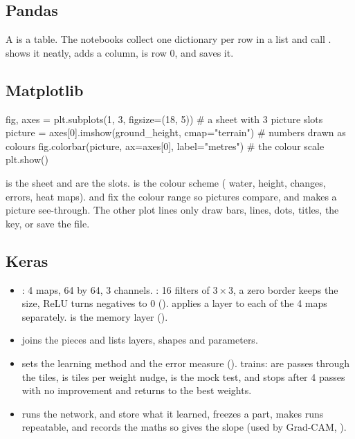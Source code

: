 \subsection{Pandas}\label{py:pandas}
A  is a table. The notebooks collect one dictionary per row in a list and call .  shows it neatly,  adds a column,  is row 0, and  saves it.

\subsection{Matplotlib}\label{py:plots}
\begin{pycode}
fig, axes = plt.subplots(1, 3, figsize=(18, 5))      # a sheet with 3 picture slots
picture = axes[0].imshow(ground_height, cmap="terrain")  # numbers drawn as colours
fig.colorbar(picture, ax=axes[0], label="metres")    # the colour scale
plt.show()
\end{pycode}
 is the sheet and  are the slots.  is the colour scheme ( water,  height,  changes,  errors,  heat maps).  and  fix the colour range so pictures compare, and  makes a picture see-through. The other plot lines only draw bars, lines, dots, titles, the key, or save the file.

\subsection{Keras}\label{py:keras}
\begin{itemize}
\item {}: 4 maps, 64 by 64, 3 channels. : 16 filters of $3\times3$, a zero border keeps the size, ReLU turns negatives to 0 ().  applies a layer to each of the 4 maps separately.  is the memory layer ().\item {} joins the pieces and  lists layers, shapes and parameters.
\item {} sets the learning method and the error measure ().  trains:  are passes through the tiles,  is tiles per weight nudge,  is the mock test, and  stops after 4 passes with no improvement and returns to the best weights.
\item {} runs the network,  and  store what it learned,  freezes a part,  makes runs repeatable, and  records the maths so  gives the slope (used by Grad-CAM, ).
\end{itemize}
